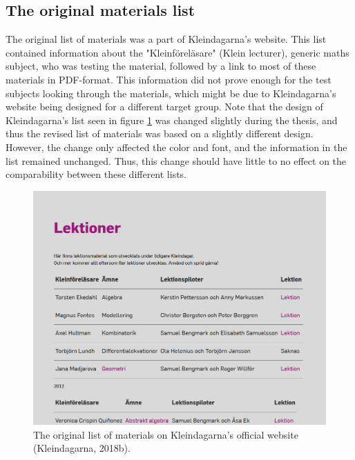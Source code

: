 \vspace{-0.5cm}
\subsection{The original materials list}

The original list of materials was a part of Kleindagarna's website. This list contained information about the "Kleinföreläsare" (Klein lecturer), generic maths subject, who was testing the material, followed by a link to most of these materials in PDF-format. This information did not prove enough for the test subjects looking through the materials, which might be due to Kleindagarna's website being designed for a different target group. Note that the design of Kleindagarna's list seen in figure \ref{fig:originmaterialslist} was changed slightly during the thesis, and thus the revised list of materials was based on a slightly different design. However, the change only affected the color and font, and the information in the list remained unchanged. Thus, this change should have little to no effect on the comparability between these different lists.
\vspace{2cm}

\begin{figure}[H]
\centering
\includegraphics[width=\linewidth]{figure/screenshot_materiallista_kleindagarna.png}
  \caption{The original list of materials on Kleindagarna's official website (Kleindagarna, 2018b).}
\label{fig:originmaterialslist}
\end{figure}



